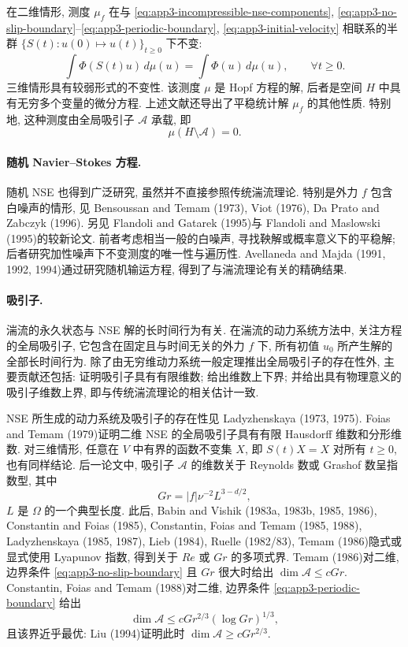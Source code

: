\hypertarget{appendix-03-page-365}{}
在二维情形, 测度 $\mu_f$ 在与 
\eqref{eq:app3-incompressible-nse-components}, 
\eqref{eq:app3-no-slip-boundary}--\eqref{eq:app3-periodic-boundary}, 
\eqref{eq:app3-initial-velocity} 相联系的半群 $\{S(t):u(0)\mapsto u(t)\}_{t\geq0}$ 下不变:
\[
\int\Phi(S(t)u)\,d\mu(u)=\int\Phi(u)\,d\mu(u),
\qquad\forall t\geq0.
\]
三维情形具有较弱形式的不变性. 该测度 $\mu$ 是 Hopf 方程的解, 后者是空间 $H$ 中具有无穷多个变量的微分方程. 上述文献还导出了平稳统计解 $\mu_f$ 的其他性质. 特别地, 这种测度由全局吸引子 $\mathcal A$ 承载, 即
\begin{equation}
\mu(H\setminus\mathcal A)=0.
\label{eq:app3-statistical-measure-attractor-support}
\end{equation}

\paragraph{随机 Navier--Stokes 方程.}
随机 NSE 也得到广泛研究, 虽然并不直接参照传统湍流理论. 特别是外力 $f$ 包含白噪声的情形, 见 Bensoussan and Temam (1973), Viot (1976), Da Prato and Zabczyk (1996). 另见 Flandoli and Gatarek (1995)与 Flandoli and Maslowski (1995)的较新论文. 前者考虑相当一般的白噪声, 寻找鞅解或概率意义下的平稳解; 后者研究加性噪声下不变测度的唯一性与遍历性. Avellaneda and Majda (1991, 1992, 1994)通过研究随机输运方程, 得到了与湍流理论有关的精确结果.

\paragraph{吸引子.}
湍流的永久状态与 NSE 解的长时间行为有关. 在湍流的动力系统方法中, 关注方程的全局吸引子, 它包含在固定且与时间无关的外力 $f$ 下, 所有初值 $u_0$ 所产生解的全部长时间行为. 除了由无穷维动力系统一般定理推出全局吸引子的存在性外, 主要贡献还包括: 证明吸引子具有有限维数; 给出维数上下界; 并给出具有物理意义的吸引子维数上界, 即与传统湍流理论的相关估计一致.

NSE 所生成的动力系统及吸引子的存在性见 Ladyzhenskaya (1973, 1975). Foias and Temam (1979)证明二维 NSE 的全局吸引子具有有限 Hausdorff 维数和分形维数. 对三维情形, 任意在 $V$ 中有界的函数不变集 $X$, 即 $S(t)X=X$ 对所有 $t\geq0$, 也有同样结论. 后一论文中, 吸引子 $\mathcal A$ 的维数关于 Reynolds 数或 Grashof 数呈指数型, 其中
\[
Gr=|f|\nu^{-2}L^{3-d/2},
\]
$L$ 是 $\Omega$ 的一个典型长度. 此后, Babin and Vishik (1983a, 1983b, 1985, 1986), Constantin and Foias (1985), Constantin, Foias and Temam (1985, 1988), Ladyzhenskaya (1985, 1987), Lieb (1984), Ruelle (1982/83), Temam (1986)隐式或显式使用 Lyapunov 指数, 得到关于 $Re$ 或 $Gr$ 的多项式界. Temam (1986)对二维, 边界条件 
\eqref{eq:app3-no-slip-boundary} 且 $Gr$ 很大时给出 $\dim\mathcal A\leq cGr$. Constantin, Foias and Temam (1988)对二维, 边界条件 
\eqref{eq:app3-periodic-boundary} 给出
\[
\dim\mathcal A\leq cGr^{2/3}(\log Gr)^{1/3},
\]
且该界近乎最优: Liu (1994)证明此时 $\dim\mathcal A\geq cGr^{2/3}$.

